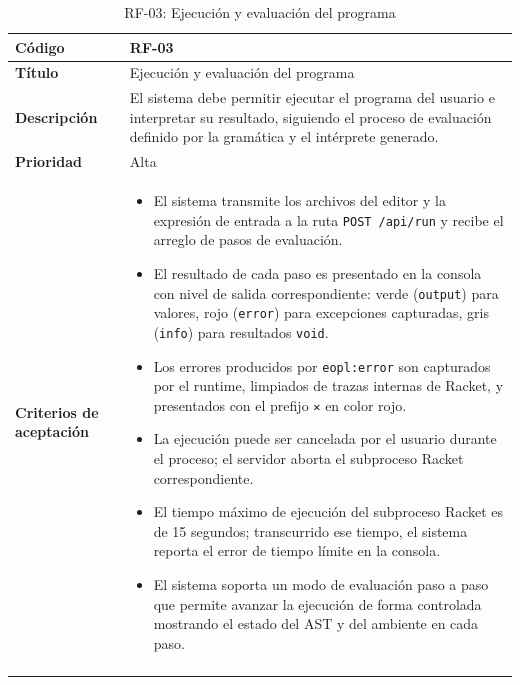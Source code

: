 \begin{longtable}{|>{\bfseries}p{3cm}|p{11cm}|}
\hline
\textbf{Código} & RF-03 \\
\hline
\textbf{Título} & Ejecución y evaluación del programa \\
\hline
\textbf{Descripción} & El sistema debe permitir ejecutar el programa del usuario e interpretar su resultado, siguiendo el proceso de evaluación definido por la gramática y el intérprete generado. \\
\hline
\textbf{Prioridad} & Alta \\
\hline
\textbf{Criterios de aceptación} &
\begin{itemize}[leftmargin=*,topsep=2pt,itemsep=1pt,parsep=0pt]
    \item El sistema transmite los archivos del editor y la expresión de entrada a la ruta \texttt{POST /api/run} y recibe el arreglo de pasos de evaluación.
    \item El resultado de cada paso es presentado en la consola con nivel de salida correspondiente: verde (\texttt{output}) para valores, rojo (\texttt{error}) para excepciones capturadas, gris (\texttt{info}) para resultados \texttt{void}.
    \item Los errores producidos por \texttt{eopl:error} son capturados por el runtime, limpiados de trazas internas de Racket, y presentados con el prefijo \texttt{✕} en color rojo.
    \item La ejecución puede ser cancelada por el usuario durante el proceso; el servidor aborta el subproceso Racket correspondiente.
    \item El tiempo máximo de ejecución del subproceso Racket es de 15 segundos; transcurrido ese tiempo, el sistema reporta el error de tiempo límite en la consola.
    \item El sistema soporta un modo de evaluación paso a paso que permite avanzar la ejecución de forma controlada mostrando el estado del AST y del ambiente en cada paso.
\end{itemize} \\
\hline
\caption{RF-03: Ejecución y evaluación del programa}
\label{tab:rf03}
\end{longtable}

